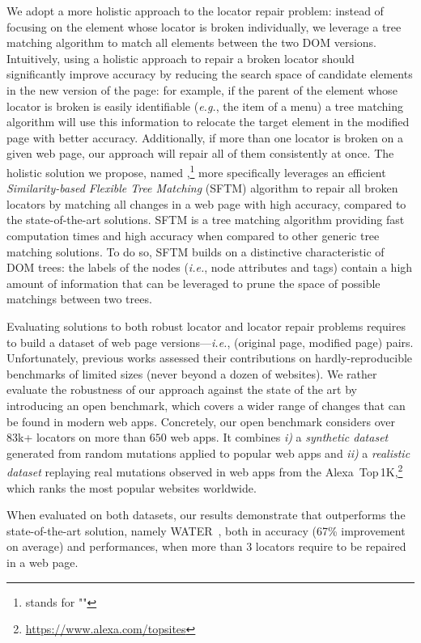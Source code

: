 We adopt a more holistic approach to the locator repair problem: instead of focusing on the element whose locator is broken individually, we leverage a tree matching algorithm to match all elements between the two DOM versions. 
Intuitively, using a holistic approach to repair a broken locator should significantly improve accuracy by reducing the search space of candidate elements in the new version of the page: for example, if the parent of the element whose locator is broken is easily identifiable (\emph{e.g.}, the item of a menu) a tree matching algorithm will use this information to relocate the target element in the modified page with better accuracy.
Additionally, if more than one locator is broken on a given web page, our approach will repair all of them consistently at once.
The holistic solution we propose, named \erratum{},\footnote{\erratum{} stands for "\erratumlong{}"} more specifically leverages an efficient \emph{Similarity-based Flexible Tree Matching} (SFTM) algorithm to repair all broken locators by matching all changes in a web page with high accuracy, compared to the state-of-the-art solutions.
SFTM is a tree matching algorithm providing fast computation times and high accuracy when compared to other generic tree matching solutions.
To do so, SFTM builds on a distinctive characteristic of DOM trees: the labels of the nodes (\emph{i.e.}, node attributes and tags) contain a high amount of information that can be leveraged to prune the space of possible matchings between two trees.

Evaluating solutions to both robust locator and locator repair problems requires to build a dataset of web page versions---\emph{i.e.}, \textsf{(original page, modified page)} pairs.
Unfortunately, previous works assessed their contributions on hardly-reproducible benchmarks of limited sizes (never beyond a dozen of websites).
We rather evaluate the robustness of our approach against the state of the art by introducing an open benchmark, which covers a wider range of changes that can be found in modern web apps.
Concretely, our open benchmark considers over 83k+ locators on more than $650$ web apps.
It combines \emph{i)} a \emph{synthetic dataset} generated from random mutations applied to popular web apps and \emph{ii)} a \emph{realistic dataset} replaying real mutations observed in web apps from the Alexa~Top\,1K,\footnote{\url{https://www.alexa.com/topsites}} which ranks the most popular websites worldwide.

When evaluated on both datasets, our results demonstrate that \erratum{} outperforms the state-of-the-art solution, namely WATER~\cite{choudhary2011water}, both in accuracy (67\% improvement on average) and performances, when more than 3 locators require to be repaired in a web page.

